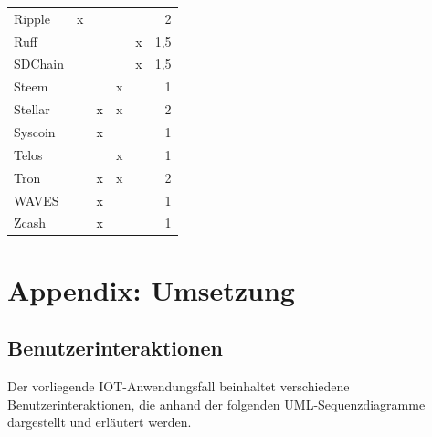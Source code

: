 \begin{table}[htbp]
\begin{tabular}{lccccr}
Ripple & x &  &  &  & 2 \\
Ruff &  &  &  & x & 1,5 \\
SDChain &  &  &  & x & 1,5 \\
Steem &  &  & x &  & 1 \\
Stellar &  & x & x &  & 2 \\
Syscoin &  & x &  &  & 1 \\
Telos &  &  & x &  & 1 \\
Tron &  & x & x &  & 2 \\
WAVES &  & x &  &  & 1 \\
Zcash &  & x &  &  & 1 \\ \hline
\end{tabular}
\end{table}


\newpage

\chapter{Appendix: Umsetzung}
\label{ch:appendix:implementation}

\section{Benutzerinteraktionen}
\label{sec:appendix:implementation:interactions}
Der vorliegende IOT-Anwendungsfall beinhaltet verschiedene Benutzerinteraktionen, die anhand der folgenden \ac{UML}-Sequenzdiagramme dargestellt und erläutert werden.\\

